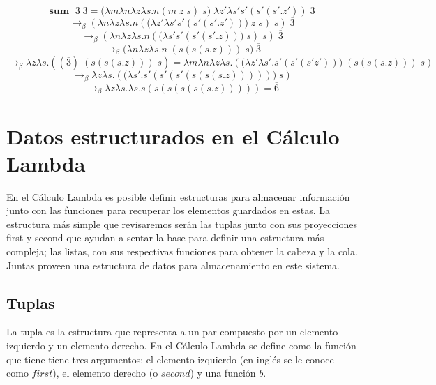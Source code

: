 \begin{exercise}
\[            \]
            \[
                    \textbf{sum } \; \overline{3} \; \overline{3} = \big(\lambda m\lambda n\lambda z\lambda s.n(m \; z \; s) \; s \big) \; \lambda z'\lambda s's'(s'(s'.z')) \; \overline{3}
            \]
            \[
                    \rightarrow_\beta (\lambda n\lambda z\lambda s.n(\big(\lambda z'\lambda s's'(s'(s'.z'))\big) \; z \; s) \; s )  \; \overline{3}
            \]
            \[
                    \rightarrow_\beta (\lambda n\lambda z\lambda s.n(\big(\lambda s's'(s'(s'.z))\big) \; s) \; s )  \; \overline{3}
            \]
            \[
                    \rightarrow_\beta \big(\lambda n\lambda z\lambda s.n \; (s(s(s.z))) \; s \big)  \; \overline{3}
            \]
            \[
                    \rightarrow_\beta \lambda z\lambda s.((\overline{3}) \; (s(s(s.z))) \; s) = \lambda m\lambda n\lambda z\lambda s.(\big( \lambda z'\lambda s'.s'(s'(s'z'))\big) \; (s(s(s.z))) \; s)
            \]
            \[
                    \rightarrow_\beta \lambda z\lambda s.(\big(\lambda s'.s'(s'(s'(s(s(s.z)))))\big)  \; s)
            \]
            \[
                    \rightarrow_\beta \lambda z\lambda s.\lambda s.s(s(s(s(s(s.z))))) = \overline{6}
            \]
        \end{exercise}

        \section{Datos estructurados en el Cálculo Lambda}

            En el Cálculo Lambda es posible definir estructuras para almacenar información junto con las funciones para recuperar los elementos guardados en estas. La estructura más simple que revisaremos serán las tuplas junto con sus proyecciones \textsf{first} y \textsf{second} que ayudan a sentar la base para definir una estructura más compleja; las listas, con sus respectivas funciones para obtener la cabeza y la cola. Juntas proveen una estructura de datos para almacenamiento en este sistema.
    
            \subsection{Tuplas}

                La tupla es la estructura que representa a un par compuesto por un elemento izquierdo y un elemento derecho. En el Cálculo Lambda se define como la función que tiene tiene tres argumentos; el elemento izquierdo (en inglés se le conoce como $first$), el elemento derecho (o $second$) y una función $b$.
        
